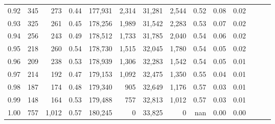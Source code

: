 \begin{tabular}{rrrrrrrrrrrrrr}
0.92 &    345 &    273 &  0.44 &  177,931 &    2,314 &  31,281 &   2,544 &  0.52 &  0.08 &      0.02 \\
0.93 &    325 &    261 &  0.45 &  178,256 &    1,989 &  31,542 &   2,283 &  0.53 &  0.07 &      0.02 \\
0.94 &    256 &    243 &  0.49 &  178,512 &    1,733 &  31,785 &   2,040 &  0.54 &  0.06 &      0.02 \\
0.95 &    218 &    260 &  0.54 &  178,730 &    1,515 &  32,045 &   1,780 &  0.54 &  0.05 &      0.02 \\
0.96 &    209 &    238 &  0.53 &  178,939 &    1,306 &  32,283 &   1,542 &  0.54 &  0.05 &      0.01 \\
0.97 &    214 &    192 &  0.47 &  179,153 &    1,092 &  32,475 &   1,350 &  0.55 &  0.04 &      0.01 \\
0.98 &    187 &    174 &  0.48 &  179,340 &      905 &  32,649 &   1,176 &  0.57 &  0.03 &      0.01 \\
0.99 &    148 &    164 &  0.53 &  179,488 &      757 &  32,813 &   1,012 &  0.57 &  0.03 &      0.01 \\
1.00 &    757 &  1,012 &  0.57 &  180,245 &        0 &  33,825 &       0 &   nan &  0.00 &      0.00 \\
\bottomrule
\end{tabular}

